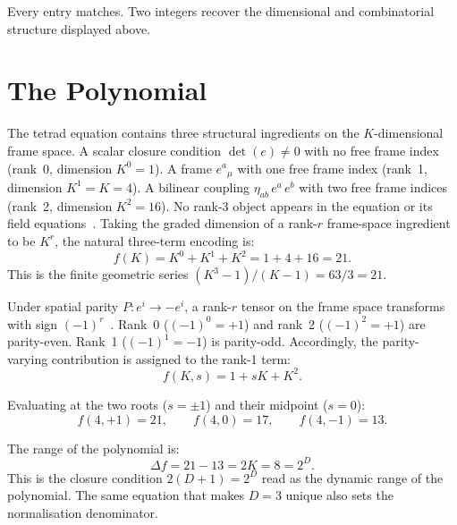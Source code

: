 \documentclass[twocolumn]{iopjournal}
\begin{document}
\noindent Every entry matches. Two integers recover the
dimensional and combinatorial structure displayed above.


\section*{The Polynomial}

The tetrad equation contains three structural ingredients on the
$K$-dimensional frame space. A scalar closure condition
$\det(e) \neq 0$ with no free frame index (rank~0, dimension
$K^0 = 1$). A frame $e^a{}_\mu$ with one free frame index
(rank~1, dimension $K^1 = K = 4$). A bilinear coupling
$\eta_{ab}\, e^a\, e^b$ with two free frame indices (rank~2,
dimension $K^2 = 16$). No rank-3 object appears in the equation
or its field equations~\cite{MTW}. Taking the graded dimension
of a rank-$r$ frame-space ingredient to be $K^r$, the natural
three-term encoding is:
\begin{equation}
  f(K) = K^0 + K^1 + K^2 = 1 + 4 + 16 = 21.
  \label{eq:poly}
\end{equation}
This is the finite geometric series $(K^3 - 1)/(K - 1) =
63/3 = 21$.

Under spatial parity $P: e^i \to -e^i$, a rank-$r$ tensor on the
frame space transforms with sign $(-1)^r$~\cite{MTW}. Rank~0
($(-1)^0 = +1$) and rank~2 ($(-1)^2 = +1$) are parity-even.
Rank~1 ($(-1)^1 = -1$) is parity-odd. Accordingly, the
parity-varying contribution is assigned to the rank-1 term:
\begin{equation}
  f(K, s) = 1 + sK + K^2.
  \label{eq:poly_s}
\end{equation}

Evaluating at the two roots ($s = \pm 1$) and their midpoint
($s = 0$):
\begin{equation}
  f(4,+1) = 21, \qquad f(4,0) = 17, \qquad f(4,-1) = 13.
\end{equation}

The range of the polynomial is:
\begin{equation}
  \Delta f = 21 - 13 = 2K = 8 = 2^D.
  \label{eq:range}
\end{equation}
This is the closure condition $2(D+1) = 2^D$ read as the
dynamic range of the polynomial. The same equation that makes
$D = 3$ unique also sets the normalisation denominator.

\end{document}
